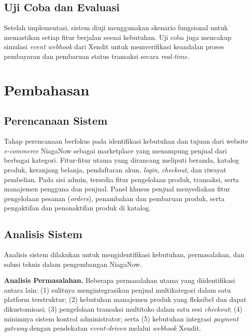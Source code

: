 \documentclass[12pt,a4paper,twocolumn]{article}
\begin{document}
\subsection{Uji Coba dan Evaluasi}

Setelah implementasi, sistem diuji menggunakan skenario fungsional untuk memastikan setiap fitur berjalan sesuai kebutuhan. Uji coba juga mencakup simulasi \textit{event webhook} dari Xendit untuk memverifikasi keandalan proses pembayaran dan pembaruan status transaksi secara \textit{real-time}.

\section{Pembahasan}

\subsection{Perencanaan Sistem}

Tahap perencanaan berfokus pada identifikasi kebutuhan dan tujuan dari website \textit{e-commerce} NiagaNow sebagai marketplace yang menampung penjual dari berbagai kategori. Fitur-fitur utama yang dirancang meliputi beranda, katalog produk, keranjang belanja, pendaftaran akun, \textit{login}, \textit{checkout}, dan riwayat pembelian. Pada sisi admin, tersedia fitur pengelolaan produk, transaksi, serta manajemen pengguna dan penjual. Panel khusus penjual menyediakan fitur pengelolaan pesanan (\textit{orders}), penambahan dan pembaruan produk, serta pengaktifan dan penonaktifan produk di katalog.

\subsection{Analisis Sistem}

Analisis sistem dilakukan untuk mengidentifikasi kebutuhan, permasalahan, dan solusi teknis dalam pengembangan NiagaNow.

\textbf{Analisis Permasalahan.} Beberapa permasalahan utama yang diidentifikasi antara lain: (1) sulitnya mengintegrasikan penjual multikategori dalam satu platform terstruktur; (2) kebutuhan manajemen produk yang fleksibel dan dapat dikustomisasi; (3) pengelolaan transaksi multitoko dalam satu sesi \textit{checkout}; (4) minimnya sistem kontrol administrator; serta (5) kebutuhan integrasi \textit{payment gateway} dengan pendekatan \textit{event-driven} melalui \textit{webhook} Xendit.
\end{document}
